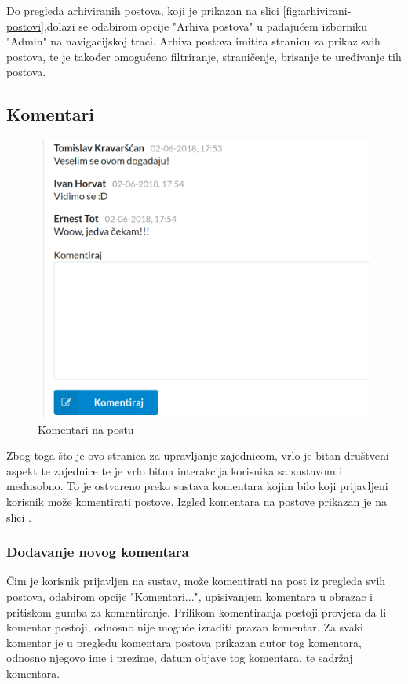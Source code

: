 \documentclass[zavrsni, numeric]{fer}
\begin{document}
Do pregleda arhiviranih postova, koji je prikazan na slici \ref{fig:arhivirani-postovi},dolazi se odabirom opcije "Arhiva postova" u padajućem izborniku "Admin" na navigacijskoj traci. Arhiva postova imitira stranicu za prikaz svih postova, te je također omogućeno filtriranje, straničenje, brisanje te uređivanje tih postova.

\subsection{Komentari}

\begin{figure}[H]
	\centering
	\includegraphics[width=13cm]{slike/komentari.png}
	\caption{Komentari na postu}
	\label{fig:komentari}
\end{figure}

Zbog toga što je ovo stranica za upravljanje zajednicom, vrlo je bitan društveni aspekt te zajednice te je vrlo bitna interakcija korisnika sa sustavom i međusobno. To je ostvareno preko sustava komentara kojim bilo koji prijavljeni korisnik može komentirati postove. Izgled komentara na postove prikazan je na slici \label{fig:komentari}.

\subsubsection{Dodavanje novog komentara}

Čim je korisnik prijavljen na sustav, može komentirati na post iz pregleda svih postova, odabirom opcije "Komentari...", upisivanjem komentara u obrazac i pritiskom gumba za komentiranje. Prilikom komentiranja postoji provjera da li komentar postoji, odnosno nije moguće izraditi prazan komentar. Za svaki komentar je u pregledu komentara postova prikazan autor tog komentara, odnosno njegovo ime i prezime, datum objave tog komentara, te sadržaj komentara.
\end{document}
